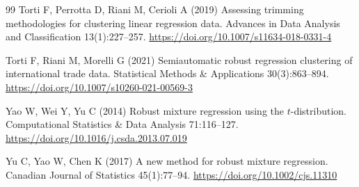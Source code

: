 \begin{thebibliography}{99}
 Torti F, Perrotta D, Riani M, Cerioli A (2019) Assessing trimming methodologies for clustering linear regression data. Advances in Data Analysis and Classification 13(1):227--257. \url{https://doi.org/10.1007/s11634-018-0331-4}

 Torti F, Riani M, Morelli G (2021) Semiautomatic robust regression clustering of international trade data. Statistical Methods \& Applications 30(3):863--894. \url{https://doi.org/10.1007/s10260-021-00569-3}

 Yao W, Wei Y, Yu C (2014) Robust mixture regression using the $t$-distribution. Computational Statistics \& Data Analysis 71:116--127. \url{https://doi.org/10.1016/j.csda.2013.07.019}

 Yu C, Yao W, Chen K (2017) A new method for robust mixture regression. Canadian Journal of Statistics 45(1):77--94. \url{https://doi.org/10.1002/cjs.11310}
\end{thebibliography}
